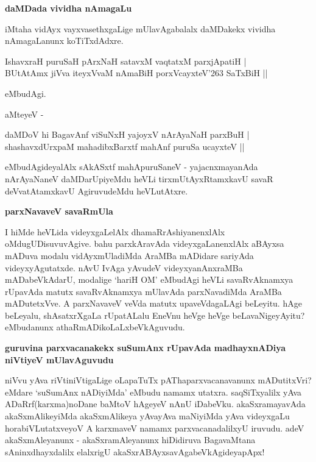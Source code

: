{\bigskip
\noindent
{\large\bf daMDada vividha nAmagaLu}}\label{page100}
\medskip

\noindent
iMtaha vidAyx vayxvasethxgaLige mUlavAgabalalx daMDakekx vividha nAmagaLanunx koTiTxdAdxre.

\begin{shloka}
IshavxraH puruSaH pArxNaH satavxM vaqtatxM parxjApatiH |\\\label{100}
BUtAtAmx jiVva iteyxVvaM nAmaBiH porxVcayxteV\char'263 SaTxBiH ||
\end{shloka}

\noindent
eMbudAgi.

\newpage

\noindent
aMteyeV -

\begin{shloka}
daMDoV hi BagavAnf viSuNxH yajoyxV nArAyaNaH parxBuH |\\\label{100a}
shashavxdUrxpaM mahadibxBarxtf mahAnf puruSa ucayxteV ||
\end{shloka}

\noindent
eMbudAgideyalAlx sAkASxtf mahApuruSaneV - yajacnxmayanAda nArAyaNaneV daMDarUpiyeMdu heVLi tirxmUtAyxRtamxkavU savaR deVvatAtamxkavU AgiruvudeMdu heVLutAtxre.

{\bigskip
\noindent
{\large\bf parxNavaveV savaRmUla}}\label{page100a}
\medskip

\noindent
I hiMde heVLida videyxgaLelAlx dhamaRrAshiyanenxlAlx oMdugUDisuvuvAgive. bahu parxkAravAda videyxgaLanenxlAlx aBAyxsa mADuva modalu vidAyxmUladiMda AraMBa mADidare sariyAda videyxyAgutatxde. nAvU IvAga yAvudeV videyxyanAnxraMBa mADabeVkAdarU, modalige `hariH OM' eMbudAgi heVLi savaRvAknamxya rUpavAda matutx savaRvAknamxya mUlavAda parxNavadiMda AraMBa mADutetxVve. A parxNavaveV veVda matutx upaveVdagaLAgi beLeyitu. hAge beLeyalu, shAsatxrXgaLa rUpatALalu EneVnu heVge heVge beLavaNigeyAyitu? eMbudanunx athaRmADikoLaLxbeVkAguvudu.

{\bigskip
\noindent
{\large\bf guruvina parxvacanakekx suSumAnx rUpavAda madhayxnADiya niVtiyeV mUlavAguvudu}}\label{page101}
\medskip

\noindent
niVvu yAva riVtiniVtigaLige oLapaTuTx pAThaparxvacanavanunx mADutitxVri? eMdare `suSumAnx nADiyiMda' eMbudu namamx utatxra. saqSiTxyalilx yAva ADaRrf(karxma)noDane baMtoV hAgeyeV nAnU iDabeVku. akaSxramayavAda akaSxmAlikeyiMda akaSxmAlikeya yAvayAva maNiyiMda yAva videyxgaLu horabiVLutatxveyoV A karxmaveV namamx parxvacanadalilxyU iruvudu. adeV akaSxmAleyanunx - akaSxramAleyanunx hiDidiruva BagavaMtana sAninxdhayxdalilx elalxrigU akaSxrABAyxsavAgabeVkAgideyapApx!

